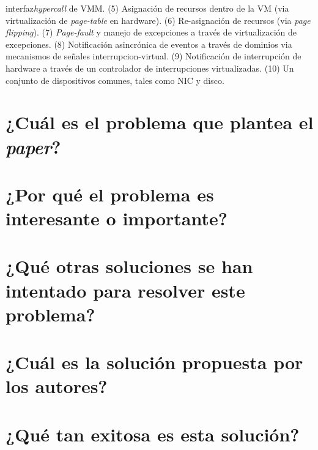 interfaz\emph{hypercall} de VMM. (5) Asignación de recursos dentro de la VM (via virtualización de \emph{page-table} en hardware). (6) Re-asignación de recursos (via \emph{page flipping}). (7) \emph{Page-fault} y manejo de excepciones a través de virtualización de excepciones. (8) Notificación asincrónica de eventos a través de dominios via mecanismos de señales interrupcion-virtual. (9) Notificación de interrupción de hardware a través de un controlador de interrupciones virtualizadas. (10) Un conjunto de dispositivos comunes, tales como NIC y disco.

\section{¿Cuál es el problema que plantea el \textit{paper}?}

\section{¿Por qué el problema es interesante o importante?}

\section{¿Qué otras soluciones se han intentado para resolver este problema?}
     
\section{¿Cuál es la solución propuesta por los autores?}

\section{¿Qué tan exitosa es esta solución?} 